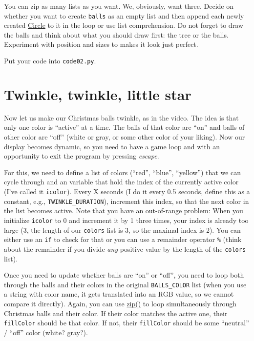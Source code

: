 \documentclass[
]{book}
\begin{document}
You can zip as many lists as you want. We, obviously, want three. Decide on whether you want to create \texttt{balls} as an empty list and then append each newly created \href{https://psychopy.org/api/visual/circle.html\#psychopy.visual.circle.Circle}{Circle} to it in the loop or use list comprehension. Do not forget to draw the balls and think about what you should draw first: the tree or the balls. Experiment with position and sizes to makes it look just perfect.

Put your code into \texttt{code02.py}.

\hypertarget{twinkle-twinkle-little-star}{%
\section{Twinkle, twinkle, little star}\label{twinkle-twinkle-little-star}}

Now let us make our Christmas balls twinkle, as in the video. The idea is that only one color is ``active'' at a time. The balls of that color are ``on'' and balls of other color are ``off'' (white or gray, or some other color of your liking). Now our display becomes dynamic, so you need to have a game loop and with an opportunity to exit the program by pressing \emph{escape}.

For this, we need to define a list of colors (``red'', ``blue'', ``yellow'') that we can cycle through and an variable that hold the index of the currently active color (I've called it \texttt{icolor}). Every X seconds (I do it every 0.5 seconds, define this as a constant, e.g., \texttt{TWINKLE\_DURATION}), increment this index, so that the next color in the list becomes active. Note that you have an out-of-range problem: When you initialize \texttt{icolor} to 0 and increment it by 1 three times, your index is already too large (3, the length of our \texttt{colors} list is 3, so the maximal index is 2). You can either use an \texttt{if} to check for that or you can use a remainder operator \texttt{\%} (think about the remainder if you divide \emph{any} positive value by the length of the \texttt{colors} list).

Once you need to update whether balls are ``on'' or ``off'', you need to loop both through the balls and their colors in the original \texttt{BALLS\_COLOR} list (when you use a string with color name, it gets translated into an RGB value, so we cannot compare it directly). Again, you can use \href{https://docs.python.org/3/library/functions.html\#zip}{zip()} to loop simultaneously through Christmas balls and their color. If their color matches the active one, their \texttt{fillColor} should be that color. If not, their \texttt{fillColor} should be some ``neutral'' / ``off'' color (white? gray?).
\end{document}
